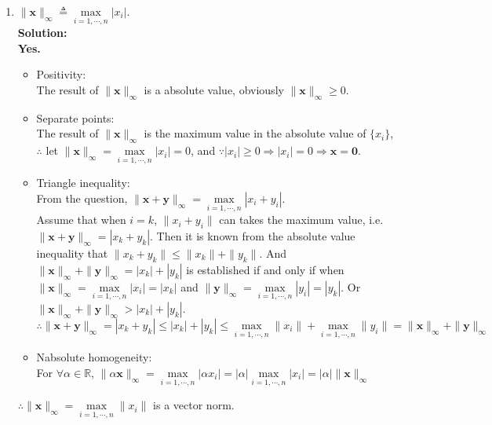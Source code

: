 \documentclass[12pt, letterpaper, onecolumn]{article}
\begin{document}
\begin{enumerate}[start=2]
\begin{enumerate}
			\item $\|\bm{x}\|_\infty\triangleq\max\limits_{i=1,\cdots,n}|x_i|$.\\%
			\textbf{Solution:}\\
			\textbf{Yes.}
			\begin{itemize}
				\item Positivity:\\
				The result of $\|\bm{x}\|_{\infty}$ is a absolute value, obviously $\|\bm{x}\|_{\infty}\geqslant0$.
				\item Separate points:\\
				The result of $\|\bm{x}\|_{\infty}$ is the maximum value in the absolute value of $\{x_{i}\}$, 
				$\therefore$ let $ \|\bm{x}\|_{\infty}=\max\limits_{i=1,\cdots,n}|x_{i} |=0$, 
				and $\because|x_{i}|\geqslant  0\Longrightarrow|x_{i}|=0\Longrightarrow\bm{x}=\bm{0}$.
				\item Triangle inequality:\\
				From the question, $\|\bm{x}+\bm{y}\|_{\infty}=\max\limits_{i=1,\cdots,n}|x_{i}+y_{i}|$.
				\\Assume that when $i=k$, $\|x_{i}+y_{i}\|$ can takes the maximum value, i.e.$\|\bm{x}+\bm{y}\|_{\infty}=|x_{k}+y_{k}|$.
				Then it is known from the absolute value inequality that $\|x_{k}+y_{k}\|\leqslant\|x_{k}\|+\|y_{k}\|$.
				And $\|\bm{x}\|_{\infty}+\|\bm{y}\|_{\infty}=|x_{k}|+|y_{k}|$ is established if and only if when
				$\|\bm{x}\|_{\infty}=\max\limits_{i=1,\cdots,n}|x_{i}|=|x_{k}|$ and 
				$\|\bm{y}\|_{\infty}=\max\limits_{i=1,\cdots,n}|y_{i}|=|y_{k}|$.
				Or $\|\bm{x}\|_{\infty}+\|\bm{y}\|_{\infty}>|x_{k}|+|y_{k}|$.
				\\$\therefore\|\bm{x}+\bm{y}\|_{\infty}=|x_{k}+y_{k}|\leqslant|x_{k}|+|y_{k}|
				\leqslant\max\limits_{i=1,\cdots,n}\|x_{i}\|+\max\limits_{i=1,\cdots,n}\|y_{i}\|=
				\|\bm{x}\|_{\infty}+\|\bm{y}\|_{\infty}$
				\item Nabsolute homogeneity:\\
				For $\forall\alpha\in\mathbb{R}$, 
				$\|\alpha \bm{x}\|_{\infty}=\max\limits_{i=1,\cdots,n}|\alpha x_{i}|=
				|\alpha|\max\limits_{i=1,\cdots,n}| x_{i} |=|\alpha|\|\bm{x}\|_{\infty}$

			\end{itemize}
			$\therefore \|\bm{x}\|_{\infty}=\max\limits_{i=1,\cdots,n}\|x_{i}\|$ is a vector norm.
			

\end{enumerate}
\end{enumerate}
\end{document}
